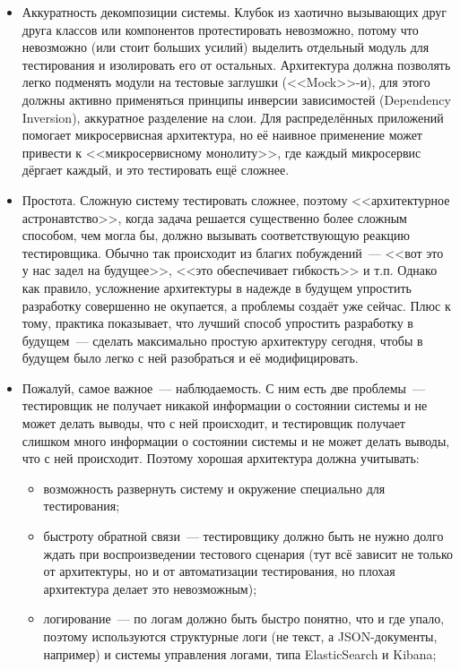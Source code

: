 \documentclass{../../text-style}
\begin{document}
\begin{itemize}
    \item Аккуратность декомпозиции системы. Клубок из хаотично вызывающих друг друга классов или компонентов протестировать невозможно, потому что невозможно (или стоит больших усилий) выделить отдельный модуль для тестирования и изолировать его от остальных. Архитектура должна позволять легко подменять модули на тестовые заглушки (<<Mock>>-и), для этого должны активно применяться принципы инверсии зависимостей (Dependency Inversion), аккуратное разделение на слои. Для распределённых приложений помогает микросервисная архитектура, но её наивное применение может привести к <<микросервисному монолиту>>, где каждый микросервис дёргает каждый, и это тестировать ещё сложнее.
    \item Простота. Сложную систему тестировать сложнее, поэтому <<архитектурное астронавтство>>, когда задача решается существенно более сложным способом, чем могла бы, должно вызывать соответствующую реакцию тестировщика. Обычно так происходит из благих побуждений~--- <<вот это у нас задел на будущее>>, <<это обеспечивает гибкость>> и т.п. Однако как правило, усложнение архитектуры в надежде в будущем упростить разработку совершенно не окупается, а проблемы создаёт уже сейчас. Плюс к тому, практика показывает, что лучший способ упростить разработку в будущем~--- сделать максимально простую архитектуру сегодня, чтобы в будущем было легко с ней разобраться и её модифицировать.
    \item Пожалуй, самое важное~--- наблюдаемость. С  ним есть две проблемы~--- тестировщик не получает никакой информации о состоянии системы и не может делать выводы, что с ней происходит, и тестировщик получает слишком много информации о состоянии системы и не может делать выводы, что с ней происходит. Поэтому хорошая архитектура должна учитывать:
    \begin{itemize}
        \item возможность развернуть систему и окружение специально для тестирования;
        \item быстроту обратной связи~--- тестировщику должно быть не нужно долго ждать при воспроизведении тестового сценария (тут всё зависит не только от архитектуры, но и от автоматизации тестирования, но плохая архитектура делает это невозможным);
        \item логирование~--- по логам должно быть быстро понятно, что и где упало, поэтому используются структурные логи (не текст, а JSON-документы, например) и системы управления логами, типа ElasticSearch и Kibana;

\end{itemize}
\end{itemize}
\end{document}
